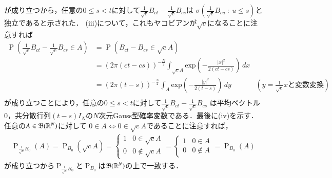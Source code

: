 \begin{prf}
\begin{description}
		が成り立つから，任意の$0 \leq s < t$に対して$\tfrac{1}{\sqrt{c}}B_{ct} - \tfrac{1}{\sqrt{c}}B_{cs}$は
		$\sigma\left(\tfrac{1}{\sqrt{c}}B_{cu}\ :\ u \leq s\right)$と独立であると示された．
		(iii)について，これもヤコビアンが$\sqrt{c}$になることに注意すれば
		\begin{align}
			\operatorname{P}\left( \tfrac{1}{\sqrt{c}}B_{ct} - \tfrac{1}{\sqrt{c}}B_{cs} \in A \right)
			&= \operatorname{P}\left( B_{ct} - B_{cs} \in \sqrt{c}A \right) \\
			&= (2\pi(ct-cs))^{-\frac{N}{2}} \int_{\sqrt{c}A} \mathrm{exp}\left( -\frac{|x|^2}{2(ct-cs)} \right)\, dx \\
			&= (2\pi(t-s))^{-\frac{N}{2}} \int_{A} \mathrm{exp}\left( -\frac{|y|^2}{2(t-s)} \right)\, dy 
				& \left( y = \tfrac{1}{\sqrt{c}}x\mbox{と変数変換}\right) \\
		\end{align}
		が成り立つことにより，任意の$0 \leq s < t$に対して$\tfrac{1}{\sqrt{c}}B_{ct} - \tfrac{1}{\sqrt{c}}B_{cs}$
		は平均ベクトル0，共分散行列$(t-s)I_N$の$N$次元Gauss型確率変数である．最後に(iv)を示す．
		任意の$A \in \mathfrak{B}(\mathbb{R}^N)$に対して
		$0 \in A \Leftrightarrow 0 \in \sqrt{c}A$であることに注意すれば，
		\begin{align}
			\operatorname{P}_{\tfrac{1}{\sqrt{c}}B_0}(A) = \operatorname{P}_{B_0}(\sqrt{c}A) 
			= \begin{cases}
				1 & 0 \in \sqrt{c}A \\
				0 & 0 \notin \sqrt{c}A
			\end{cases}
			= \begin{cases}
				1 & 0 \in A \\
				0 & 0 \notin A
			\end{cases}
			= \operatorname{P}_{B_0}(A)
		\end{align}
		が成り立つから$\operatorname{P}_{\tfrac{1}{\sqrt{c}}B_0}$と$\operatorname{P}_{B_0}$は$\mathfrak{B}(\mathbb{R}^N)$の上で一致する．
\end{description}
\end{prf}
